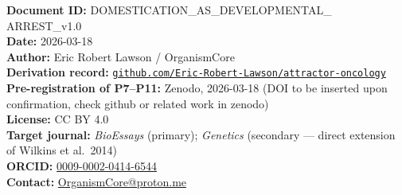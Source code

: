 \documentclass[11pt, a4paper]{article}
\begin{document}
{\footnotesize
\textbf{Document ID:} DOMESTICATION\_AS\_DEVELOPMENTAL\_
ARREST\_v1.0\\
\textbf{Date:} 2026-03-18\\
\textbf{Author:} Eric Robert Lawson / OrganismCore\\
\textbf{Derivation record:}
\href{https://github.com/Eric-Robert-Lawson/attractor-oncology}
{\texttt{github.com/Eric-Robert-Lawson/attractor-oncology}}\\
\textbf{Pre-registration of P7--P11:} Zenodo, 2026-03-18
(DOI to be inserted upon confirmation, check github or related work in zenodo)\\
\textbf{License:} CC BY 4.0\\
\textbf{Target journal:} \textit{BioEssays}
(primary); \textit{Genetics} (secondary ---
direct extension of Wilkins et al.\ 2014)\\
\textbf{ORCID:}
\href{https://orcid.org/0009-0002-0414-6544}
{0009-0002-0414-6544}\\
\textbf{Contact:}
\href{mailto:OrganismCore@proton.me}
{OrganismCore@proton.me}
}
\end{document}

